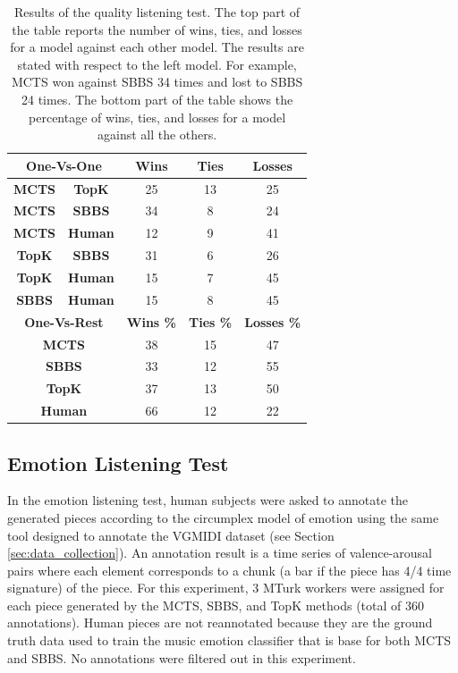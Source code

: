 \begin{table}[h]
    \centering
    \begin{tabular}{ccccc}
    \toprule
   \multicolumn{2}{c}{\textbf{One-Vs-One}} & \textbf{Wins} & \textbf{Ties} & \textbf{Losses} \\
    \midrule
    \textbf{MCTS} & \textbf{TopK } & 25 & 13 & 25 \\
    \textbf{MCTS} & \textbf{SBBS } & 34 & 8  & 24 \\
    \textbf{MCTS} & \textbf{Human} & 12 & 9  & 41 \\
    \textbf{TopK} & \textbf{SBBS } & 31 & 6  & 26 \\
    \textbf{TopK} & \textbf{Human} & 15 & 7  & 45 \\
    \textbf{SBBS} & \textbf{Human} & 15 & 8  & 45 \\
    \midrule
    \multicolumn{2}{c}{\textbf{One-Vs-Rest}} & \textbf{Wins \%} & \textbf{Ties \%} & \textbf{Losses \%}  \\
    \midrule
    \multicolumn{2}{c}{\textbf{MCTS}} & 38 & 15 & 47  \\
    \multicolumn{2}{c}{\textbf{SBBS}} & 33 & 12 & 55  \\
    \multicolumn{2}{c}{\textbf{TopK}} & 37 & 13 & 50 \\
    \multicolumn{2}{c}{\textbf{Human}} & 66 & 12 & 22 \\
    \bottomrule
    \end{tabular}
    \caption{Results of the quality listening test. The top part of the table reports the number of wins, ties, and losses for a model against each other model. The results are stated with respect to the left model. For example, MCTS won against SBBS 34 times and lost to SBBS 24 times. The bottom part of the table shows the percentage of wins, ties, and losses for a model against all the others.}
    \label{tab:quality}
\end{table}

\subsection{Emotion Listening Test}

In the emotion listening test, human subjects were asked to annotate the generated pieces according to the circumplex model of emotion using the same tool designed to annotate the VGMIDI dataset (see Section \ref{sec:data_collection}). An annotation result is a time series of valence-arousal pairs where each element corresponds to a chunk (a bar if the piece has 4/4 time signature) of the piece. For this experiment, 3 MTurk workers were assigned for each piece generated by the MCTS, SBBS, and TopK methods (total of 360 annotations). Human pieces are not reannotated because they are the ground truth data used to train the music emotion classifier that is base for both MCTS and SBBS. No annotations were filtered out in this experiment.

